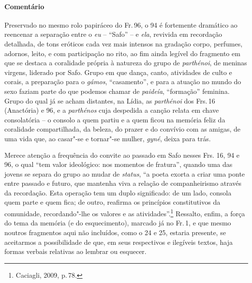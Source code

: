{\paragraph{Comentário} Preservado no mesmo rolo papiráceo do Fr.\,96, o 94 é fortemente dramático ao
reencenar a separação entre o \textit{eu} -- ``Safo'' -- e \textit{ela}, revivida em
recordação detalhada, de tons eróticos cada vez mais intensos na
gradação corpo, perfumes, adornos, leito, e com participação no rito,
ao fim ainda legível do fragmento em que se destaca a coralidade própria à natureza do grupo de \textit{parthénoi}, de meninas virgens, liderado por Safo. Grupo em que dança, canto, atividades de culto e corais, a preparação para o \textit{gámos}, ``casamento'', e para a atuação no mundo do sexo faziam parte do que podemos chamar de \textit{paideía}, ``formação'' feminina. Grupo do qual já se acham distantes, na Lídia, as \textit{parthénoi} dos Frs.\,16 (Anactória) e 96, e a \textit{parthénos} cuja despedida a canção relata em chave consolatória -- o consolo a quem partiu e a quem ficou na memória feliz da coralidade compartilhada, da beleza, do prazer e do convívio com as amigas, de uma vida que, ao casar"-se e tornar"-se mulher, \textit{gyné}, deixa para trás.

Merece atenção a frequência do convite ao passado em Safo nesses Frs. 16, 94 e 96, o qual ``tem valor ideológico: nos momentos de fratura'', quando uma das jovens se separa do grupo ao mudar de \textit{status}, ``a poeta exorta a criar uma ponte entre passado e futuro, que mantenha viva a relação de companheirismo através da recordação. Esta operação tem um duplo significado: de um lado, consola quem parte e quem fica; de outro, reafirma os princípios constitutivos da comunidade, recordando"-lhe os valores e as atividades''.\footnote{Caciagli, 2009, p.\,78.}
Ressalto, enfim, a força do tema da memória (e do esquecimento), marcado já no Fr.\,1, e que mesmo noutros fragmentos aqui não incluídos, como o 24 e 25, estaria presente, se aceitarmos a possibilidade de que, em seus respectivos e ilegíveis textos, haja formas verbais relativas ao lembrar ou esquecer.
}







